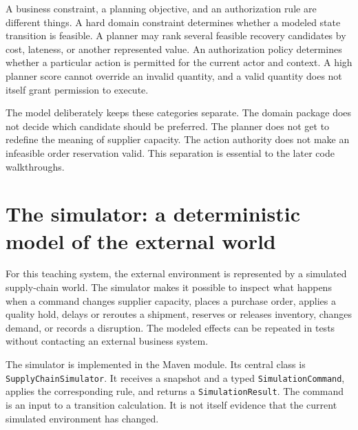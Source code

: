 \begin{notebox}
A business constraint, a planning objective, and an authorization rule are different things. A hard domain constraint determines whether a modeled state transition is feasible. A planner may rank several feasible recovery candidates by cost, lateness, or another represented value. An authorization policy determines whether a particular action is permitted for the current actor and context. A high planner score cannot override an invalid quantity, and a valid quantity does not itself grant permission to execute.
\end{notebox}

The model deliberately keeps these categories separate. The domain package does not decide which candidate should be preferred. The planner does not get to redefine the meaning of supplier capacity. The action authority does not make an infeasible order reservation valid. This separation is essential to the later code walkthroughs.

\section{The simulator: a deterministic model of the external world}
\label{sec:ch19-simulator}

For this teaching system, the external \gls{environment} is represented by a simulated supply-chain world. The simulator makes it possible to inspect what happens when a command changes supplier capacity, places a purchase order, applies a quality hold, delays or reroutes a shipment, reserves or releases inventory, changes demand, or records a disruption. The modeled effects can be repeated in tests without contacting an external business system.

The simulator is implemented in the  Maven module. Its central class is \texttt{SupplyChainSimulator}. It receives a snapshot and a typed \texttt{SimulationCommand}, applies the corresponding rule, and returns a \texttt{SimulationResult}. The command is an input to a transition calculation. It is not itself evidence that the current simulated environment has changed.

